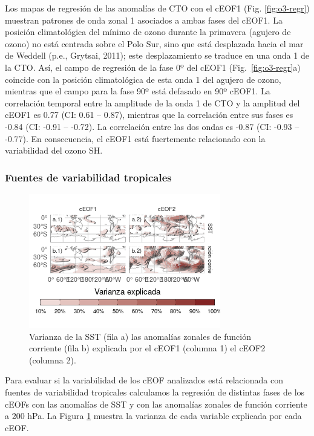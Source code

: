 \documentclass[12pt,oneside]{reedthesis}
\begin{document}
Los mapas de regresión de las anomalías de CTO con el cEOF1 (Fig. \ref{fig:o3-regr}) muestran patrones de onda zonal 1 asociados a ambas fases del cEOF1.
La posición climatológica del mínimo de ozono durante la primavera (agujero de ozono) no está centrada sobre el Polo Sur, sino que está desplazada hacia el mar de Weddell (p.e., Grytsai, 2011); este desplazamiento se traduce en una onda 1 de la CTO.
Así, el campo de regresión de la fase 0º del cEOF1 (Fig.~\ref{fig:o3-regr}a) coincide con la posición climatológica de esta onda 1 del agujero de ozono, mientras que el campo para la fase 90º está defasado en 90º cEOF1.
La correlación temporal entre la amplitude de la onda 1 de CTO y la amplitud del cEOF1 es 0.77 (CI: 0.61 -- 0.87), mientras que la correlación entre sus fases es -0.84 (CI: -0.91 -- -0.72).
La correlación entre las dos ondas es -0.87 (CI: -0.93 -- -0.77).
En consecuencia, el cEOF1 está fuertemente relacionado con la variabilidad del ozono SH.

\hypertarget{fuentes-de-variabilidad-tropicales}{%
\subsubsection{Fuentes de variabilidad tropicales}\label{fuentes-de-variabilidad-tropicales}}



\begin{figure}
\includegraphics{figures/20-ceofs/psi-sst-explained-variance-1} \caption{Varianza de la SST (fila a) las anomalías zonales de función corriente (fila b) explicada por el cEOF1 (columna 1) el cEOF2 (columna 2).}\label{fig:psi-sst-explained-variance}
\end{figure}

Para evaluar si la variabilidad de los cEOF analizados está relacionada con fuentes de variabilidad tropicales calculamos la regresión de distintas fases de los cEOFs con las anomalías de SST y con las anomalías zonales de función corriente a 200 hPa.
La Figura \ref{fig:psi-sst-explained-variance} muestra la varianza de cada variable explicada por cada cEOF.
\end{document}
